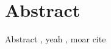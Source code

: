 \documentclass[../main.tex]{subfiles}
\begin{document}
    \section{Abstract}
    Abstract \cite{office}, yeah \cite{lookbook}, moar cite \cite{gradcam}
    \newline
    \cite{spp}
\end{document}
